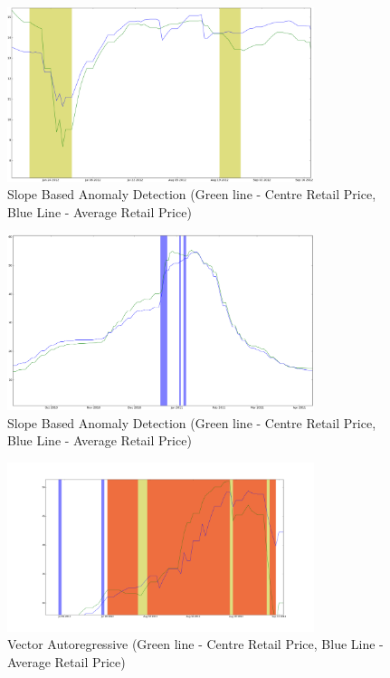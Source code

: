 \documentclass[a4paper,10pt]{article}
\begin{document}
\begin{figure}[H]
\centering
\includegraphics[width=0.8\textwidth]{graphs/12112.png}
\caption{Slope Based Anomaly Detection (Green line - Centre Retail Price, Blue Line - Average Retail Price)}
\label{fig:12112}
\end{figure}

\begin{figure}[H]
\centering
\includegraphics[width=0.8\textwidth]{graphs/12113.png}
\caption{Slope Based Anomaly Detection (Green line - Centre Retail Price, Blue Line - Average Retail Price)}
\label{fig:12113}
\end{figure}

\begin{figure}[H]
\centering
\includegraphics[width=0.8\textwidth]{graphs/20130719_0911.png}
\caption{Vector Autoregressive (Green line - Centre Retail Price, Blue Line - Average Retail Price)}
\label{fig:20130719_0911}
\end{figure}
\end{document}

